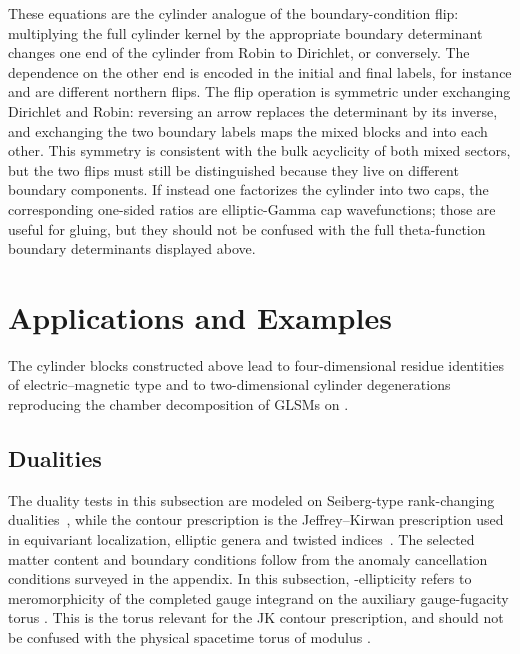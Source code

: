 \documentclass[11pt,a4paper]{article}
\makeatletter
\numberwithin{equation}{section}
\theoremstyle{plain}
\theoremstyle{definition}
\theoremstyle{remark}
\newcommand{\cyl}{\mathsf{Cyl}}
\newcounter{mathrecordid}
\newcommand{\mathboxbegin}[1]{%
  \stepcounter{mathrecordid}%
  \immediate\write\mathrecords{\themathrecordid,#1}%
  \special{pdf:bann << /Type /Annot /Subtype /Link /Border [0 0 0]
    /MathBoxID \themathrecordid /F 2
    /A << /S /URI /URI (urn:mathbox:\themathrecordid) >> >>}}
\newcommand{\mathboxinlineplain}[1]{$#1$}
\newcommand{\mathboxinline}[1]{%
  $\mathboxbegin{inline}%
  \special{pdf:literal direct /MathBoxBegin\themathrecordid\space MP}%
  #1\special{pdf:literal direct /MathBoxEnd\themathrecordid\space MP}%
  \special{pdf:eann}$}
\newcommand{\recordmath}{%
  \ifmeasuring@\expandafter\mathboxinlineplain
  \else\expandafter\mathboxinline\fi}
\makeatother
\begin{document}
These equations are the cylinder analogue of the boundary-condition flip: multiplying the full cylinder kernel by the appropriate boundary determinant changes one end of the cylinder from Robin to Dirichlet, or conversely.  The dependence on the other end is encoded in the initial and final labels, for instance \recordmath{RR\to DR} and \recordmath{RD\to DD} are different northern flips.  The flip operation is symmetric under exchanging Dirichlet and Robin: reversing an arrow replaces the determinant by its inverse, and exchanging the two boundary labels maps the mixed blocks \recordmath{z_{\rm DR}} and \recordmath{z_{\rm RD}} into each other.  This symmetry is consistent with the bulk acyclicity of both mixed sectors, but the two flips must still be distinguished because they live on different boundary components.  If instead one factorizes the cylinder into two caps, the corresponding one-sided ratios are elliptic-Gamma cap wavefunctions; those are useful for gluing, but they should not be confused with the full theta-function boundary determinants displayed above.


\section{Applications and Examples}\label{sec:applications-examples}

The cylinder blocks constructed above lead to four-dimensional \recordmath{\cyl\times T^2} residue identities of electric--magnetic type and to two-dimensional cylinder degenerations reproducing the chamber decomposition of GLSMs on \recordmath{\cyl\simeq I\times S^1}.



\subsection{Dualities}\label{sec:duality}

The duality tests in this subsection are modeled on Seiberg-type rank-changing dualities~\cite{Seiberg:1994pq}, while the contour prescription is the Jeffrey--Kirwan prescription used in equivariant localization, elliptic genera and twisted indices~\cite{JeffreyKirwan1995,Benini:2013xpa,Benini:2013nda,Closset:2017zgf}. The selected matter content and boundary conditions follow from the anomaly cancellation conditions surveyed in the appendix. In this subsection, \recordmath{\omega}-ellipticity refers to meromorphicity of the completed gauge integrand on the auxiliary gauge-fugacity torus \recordmath{u\sim u+1\sim u+\omega}. This is the torus relevant for the JK contour prescription, and should not be confused with the physical spacetime torus of modulus \recordmath{\tau}.
\end{document}
